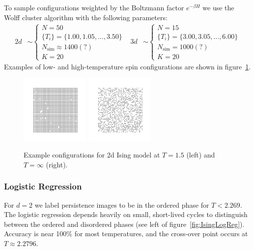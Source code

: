 \documentclass[11pt]{article}
\begin{document}
To sample configurations weighted by the Boltzmann factor $e^{-\beta H}$ we use the Wolff cluster algorithm with the following parameters:
\begin{align}
    2d&\sim\left\{\begin{array}{l}
        N = 50\\
        \{T_i\} = \{1.00,1.05,\ldots,3.50\}\\
        N_\text{sim} \approx 1400 (?)\\
        K = 20
    \end{array}\right. & 3d&\sim\left\{\begin{array}{l}
        N = 15\\
        \{T_i\} = \{3.00,3.05,\ldots,6.00\}\\
        N_\text{sim} = 1000 (?)\\
        K = 20
    \end{array}\right.
\end{align}
Examples of low- and high-temperature spin configurations are shown in figure~\ref{fig:IsingExampleConfigs}.

\begin{figure}[h]
    \centering
    \includegraphics[width=0.3\textwidth]{ising_images/ising_T=150.png}
    \includegraphics[width=0.3\textwidth]{ising_images/ising_T=inf.png}
    \caption{Example configurations for 2d Ising model at $T=1.5$ (left) and $T=\infty$ (right).}
    \label{fig:IsingExampleConfigs}
\end{figure}

\subsubsection{Logistic Regression}
For $d=2$ we label persistence images to be in the ordered phase for $T<2.269$. The logistic regression depends heavily on small, short-lived cycles to distinguish between the ordered and disordered phases (see left of figure~\ref{fig:IsingLogReg}). Accuracy is near 100\% for most temperatures, and the cross-over point occurs at $T\approx 2.2796$.
\end{document}

